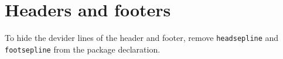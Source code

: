 \documentclass{article}
\begin{document}
\section*{Headers and footers}

\noindent To hide the devider lines of the header and footer, remove
\texttt{headsepline} and \texttt{footsepline} from the package declaration.
\end{document}
